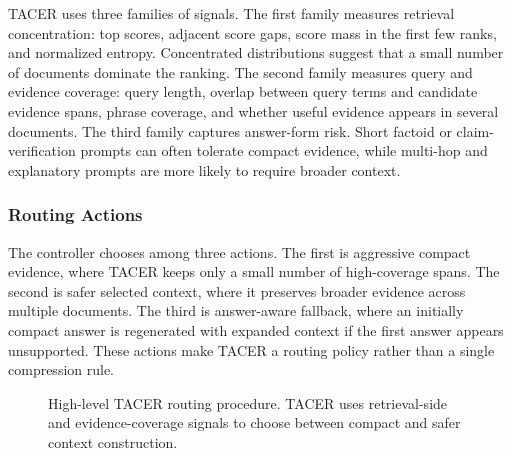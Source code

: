 \documentclass[11pt]{article}
\begin{document}
TACER uses three families of signals. The first family measures retrieval concentration: top scores, adjacent score gaps, score mass in the first few ranks, and normalized entropy. Concentrated distributions suggest that a small number of documents dominate the ranking. The second family measures query and evidence coverage: query length, overlap between query terms and candidate evidence spans, phrase coverage, and whether useful evidence appears in several documents. The third family captures answer-form risk. Short factoid or claim-verification prompts can often tolerate compact evidence, while multi-hop and explanatory prompts are more likely to require broader context.

\subsubsection{Routing Actions}

The controller chooses among three actions. The first is aggressive compact evidence, where TACER keeps only a small number of high-coverage spans. The second is safer selected context, where it preserves broader evidence across multiple documents. The third is answer-aware fallback, where an initially compact answer is regenerated with expanded context if the first answer appears unsupported. These actions make TACER a routing policy rather than a single compression rule.

\begin{figure}[t]
\centering
{}
\caption{High-level TACER routing procedure. TACER uses retrieval-side and evidence-coverage signals to choose between compact and safer context construction.}
\label{fig:tacer_algorithm}
\end{figure}
\end{document}

